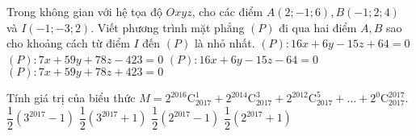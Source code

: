 \begin{ex}%
	Trong không gian với hệ tọa độ $Oxyz$, cho các điểm $A(2;-1;6), B(-1;2;4)$ và $I(-1;-3;2)$. Viết phương trình mặt phẳng $(P)$ đi qua hai điểm $A, B$ sao cho khoảng cách từ điểm $I$ đến $(P)$ là nhỏ nhất.
	\choice
	{\True $(P):16x+6y-15z+64=0$}
	{$(P):7x+59y+78z-423=0$}
	{$(P):16x+6y-15z-64=0$}
	{$(P):7x+59y+78z+423=0$}
\end{ex}

\begin{ex}%
	Tính giá trị của biểu thức
	$M=2^{2016}\mathrm{C}_{2017}^1+2^{2014}\mathrm{C}_{2017}^3+2^{2012}\mathrm{C}_{2017}^5+\ldots+2^0\mathrm{C}_{2017}^{2017}$.
	\choice
	{\True $\dfrac{1}{2}\left(3^{2017}-1\right)$}
	{$\dfrac{1}{2}\left(3^{2017}+1\right)$}
	{$\dfrac{1}{2}\left(2^{2017}-1\right)$}
	{$\dfrac{1}{2}\left(2^{2017}+1\right)$}
\end{ex}


